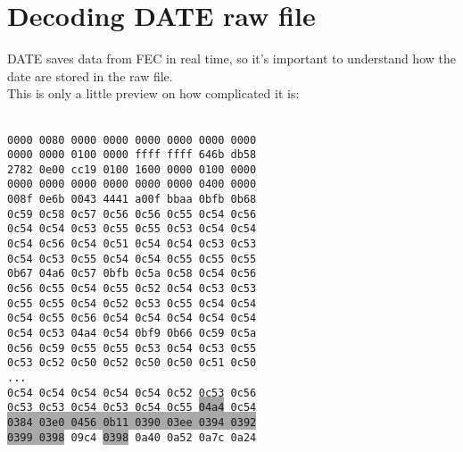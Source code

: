 \documentclass[a4paper,12pt]{article}
\begin{document}
 	\section{Decoding DATE raw file}
 		DATE saves data from FEC in real time, so it's important to understand how the date are stored in the raw file.\\
 		This is only a little preview on how complicated it is:\\
 		\vspace{0.2cm}\\
 		{\scriptsize
 		\begin{minipage}[c]{0.49\textwidth}
			\texttt{0000 0080 0000 0000 0000 0000 0000 0000\\
			0000 0000 0100 0000 ffff ffff 646b db58\\
			2782 0e00 cc19 0100 1600 0000 0100 0000\\
			0000 0000 0000 0000 0000 0000 0400 0000\\
			008f 0e6b {\color{lime}00}{\color{blue}43 4441} {\color{pink}a00f bbaa} {\color{red}0bfb 0b68\\
			0c59 0c58 0c57 0c56 0c56 0c55 0c54 0c56\\
			0c54 0c54 0c53 0c55 0c55 0c53 0c54 0c54\\
			0c54 0c56 0c54 0c51 0c54 0c54 0c53 0c53\\
			0c54 0c53 0c55 0c54 0c54 0c55 0c55 0c55\\
			0b67} {\color{green}04a6} {\color{red}0c57 0bfb 0c5a 0c58 0c54 0c56\\
			0c56 0c55 0c54 0c55 0c52 0c54 0c53 0c53\\
			0c55 0c55 0c54 0c52 0c53 0c55 0c54 0c54\\
			0c54 0c55 0c56 0c54 0c54 0c54 0c54 0c54\\
			0c54 0c53} {\color{green}04a4} {\color{red}0c54 0bf9 0b66 0c59 0c5a\\
			0c56 0c59 0c55 0c55 0c53 0c54 0c53 0c55\\
			0c53 0c52 0c50 0c52 0c50 0c50 0c51 0c50\\
			...\\
			0c54 0c54 0c54 0c54 0c54 0c52 0c53 0c56\\
			0c53 0c53 0c54 0c53 0c54 0c55} \colorbox{darkgray}{\color{green}04a4} {\color{red}0c54}\\
			\colorbox{darkgray}{{\color{green}0384 03e0 0456} {\color{red}0b11} {\color{green}0390 03ee 0394 0392}}\\
			\colorbox{darkgray}{\color{green}0399 0398} {\color{yellow}09c4} \colorbox{darkgray}{\color{green}0398} {\color{yellow}0a40 0a52 0a7c 0a24\\
}}
\end{minipage}}
\end{document}
